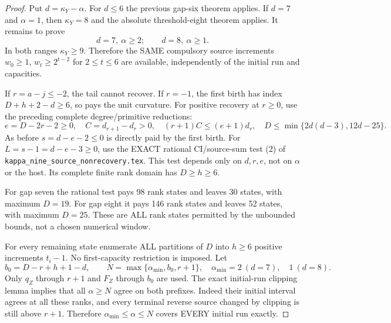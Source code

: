 \begin{proof}
Put $d=\kappa_Y-\alpha$. For $d\le6$ the previous gap-six
theorem applies. If $d=7$ and $\alpha=1$, then $\kappa_Y=8$
and the absolute threshold-eight theorem applies.
It remains to prove
\[
              d=7,\ \alpha\ge2;\qquad d=8,\ \alpha\ge1.         \tag{2}
\]
In both ranges $\kappa_Y\ge9$. Therefore the SAME compulsory
source increments $w_0\ge1$, $w_t\ge2^{t-2}$ for $2\le t\le6$
are available, independently of the initial run and capacities.

If $r=a-j\le-2$, the tail cannot recover. If $r=-1$, the first
birth has index $D+h+2-d\ge6$, so pays the unit curvature.
For positive recovery at $r\ge0$, use the preceding complete
degree/primitive reductions:
\[
 e=D-2r-2\ge0,\quad C=d_{r+1}-d_r>0,\quad
 (r+1)C\le(e+1)d_r,\quad
 D\le\min\{2d(d-3),12d-25\}.
\]
As before $s=d-e-2\le0$ is directly paid by the first birth.
For $L=s-1=d-e-3\ge0$, use the EXACT rational CI/source-sum
test (2) of \texttt{kappa\_nine\_source\_nonrecovery.tex}.
This test depends only on $d,r,e$, not on $\alpha$ or the host.
Its complete finite rank domain has $D\ge h\ge6$.

For gap seven the rational test pays 98 rank states and leaves
30 states, with maximum $D=19$. For gap eight it pays 146
rank states and leaves 52 states, with maximum $D=25$.
These are ALL rank states permitted by the unbounded bounds,
not a chosen numerical window.

For every remaining state enumerate ALL partitions of $D$ into
$h\ge6$ positive increments $t_i-1$. No first-capacity restriction
is imposed. Let
\[
 b_0=D-r+h+1-d,\qquad
 N=\max\{\alpha_{\min},b_0,r+1\},
 \quad\alpha_{\min}=2\ (d=7),\quad1\ (d=8).
\]
Only $q_Z$ through $r+1$ and $F_Z$ through $b_0$ are used.
The exact initial-run clipping lemma implies that all $\alpha\ge N$
agree on both prefixes. Indeed their initial interval agrees at all
these ranks, and every terminal reverse source changed by clipping
is still above $r+1$. Therefore
$\alpha_{\min}\le\alpha\le N$ covers EVERY initial run exactly.


\end{proof}
